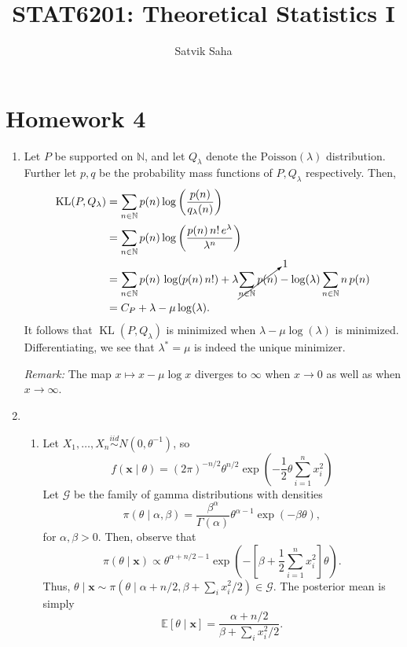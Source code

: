 \documentclass[11pt]{article}
\title{\bfseries STAT6201: Theoretical Statistics I}
\author{Satvik Saha}
\date{}
\newcommand{\N}{\mathbb{N}}
\newcommand{\EE}{\mathbb{E}}
\newcommand{\iid}{\overset{iid}{\sim}}
\DeclareMathOperator*{\KL}{KL}
\begin{document}
    \maketitle

    \section*{Homework 4}

    \begin{enumerate}
        \item Let $P$ be supported on $\N$, and let $Q_\lambda$ denote the
        $\text{Poisson}(\lambda)$ distribution.
        Further let $p, q$ be the probability mass functions of $P, Q_\lambda$
        respectively.
        Then, \begin{align*}
            \KL(P, Q_\lambda)
                &= \sum_{n \in \N} p(n) \log\left(\frac{p(n)}{q_\lambda(n)}\right) \\
                &= \sum_{n \in \N} p(n) \log\left(\frac{p(n)\,n!\, e^\lambda}{\lambda^n}\right) \\
                &= \sum_{n \in \N} p(n)\,\log(p(n)\, n!)
                    + \lambda \cancelto{1}{\sum_{n \in \N} p(n)}
                    - \log(\lambda) \sum_{n \in \N} n\, p(n) \\
                &= C_P + \lambda - \mu \log(\lambda).
        \end{align*}
        It follows that $\KL(P, Q_\lambda)$ is minimized when $\lambda - \mu
        \log(\lambda)$ is minimized.
        Differentiating, we see that $\lambda^* = \mu$ is indeed the unique
        minimizer.

        \emph{Remark:} The map $x \mapsto x - \mu \log{x}$ diverges to $\infty$
        when $x \to 0$ as well as when $x \to \infty$.


        \item
        \begin{enumerate}
            \item Let $X_1, \dots, X_n \iid N(0, \theta^{-1})$, so \[
                f(\bm{x}\mid \theta) = (2\pi)^{-n / 2} \theta^{n / 2} \exp\left(-\frac{1}{2}\theta\sum_{i = 1}^n x_i^2\right)
            \] Let $\mathscr{G}$ be the family of gamma distributions with densities \[
                \pi(\theta\mid \alpha, \beta) = \frac{\beta^\alpha}{\Gamma(\alpha)} \theta^{\alpha - 1} \exp(-\beta \theta),
            \] for $\alpha, \beta > 0$.
            Then, observe that \[
                \pi(\theta \mid \bm{x})
                    \propto \theta^{\alpha + n / 2 - 1} \exp\left(-\left[\beta + \frac{1}{2}\sum_{i = 1}^n x_i^2\right]\theta\right).
            \] Thus, $\theta\mid\bm{x} \sim \pi(\theta\mid \alpha + n / 2,
            \beta + \sum_i x_i^2 / 2) \in \mathscr{G}$.
            The posterior mean is simply \[
                \EE[\theta \mid \bm{x}] = \frac{\alpha + n / 2}{\beta + \sum_i x_i^2 / 2}.
            \]


\end{enumerate}
\end{enumerate}
\end{document}
